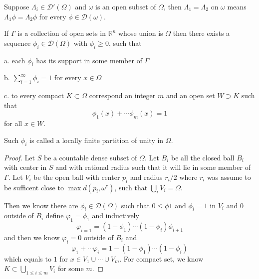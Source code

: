\documentclass[lang=en, color=blue, ]{elegantbook}
\newcommand{\R}{\mathbb{R}}
\newcommand{\D}{\mathscr{D}}
\begin{document}
\begin{definition}
    Suppose $\Lambda_i\in \D'(\Omega)$ and $\omega$ is an open subset of $\Omega$, then $\Lambda_1 = \Lambda_2$ on $\omega$ means $\Lambda_1 \phi = \Lambda_2 \phi$ for every $\phi \in \D(\omega)$.
\end{definition}

\begin{theorem}
    If $\Gamma$ is a collection of open sets in $\R^n$ whose union is $\Omega$ then there exists a sequence $\phi_i \in \D(\Omega)$ with $\phi_i \geq 0$, such that\par
    a. each $\phi_i$ has its support in some member of $\Gamma$\par
    b. $\sum\limits_{i=1}^{\infty} \phi_i = 1$ for every $x\in \Omega$\par
    c. to every compact $K\subset\Omega$ correspond an integer $m$ and an open set $W\supset K$ such that
    \[\phi_1(x) + \cdots \phi_m(x) = 1\]
    for all $x\in W$.\par
    Such $\phi_i$ is called a locally finite partition of unity in $\Omega$.
\end{theorem}
\begin{proof}
    Let $S$ be a countable dense subset of $\Omega$. Let $B_i$ be all the closed ball $B_i$ with center in $S$ and with rational radius such that it will lie in some member of $\Gamma$. Let $V_i$ be the open ball with center $p_i$ and radius $r_i/2$ where $r_i$ was assume to be sufficent close to $\max d(p_i, \omega^c)$, such that $\bigcup_{i} V_i = \Omega$.\par
    Then we know there are $\phi_i \in \D(\Omega)$ such that $0\leq \phi 1$ and $\phi_i = 1$ in $V_i$ and $0$ outside of $B_i$ define $\varphi_1 = \phi_1$ and inductively
    \[
    \varphi_{i=1} = (1-\phi_1)\cdots(1-\phi_i)\phi_{i+1}
    \]
    and then we know $\varphi_i = 0$ outside of $B_i$ and
    \[
    \varphi_1 + \cdots \varphi_i = 1 - (1-\phi_1)\cdots(1-\phi_i)
    \] 
    which equals to $1$ for $ x \in V_1\cup \cdots \cup V_m$. For compact set, we know $K\subset \bigcup_{1\leq i \leq m}V_i$ for some $m$.
\end{proof}
\end{document}
